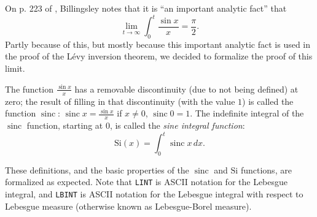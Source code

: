 \documentclass{article}
\theoremstyle{definition}
\newcommand\sinc{\mathop{\text{sinc}}\nolimits}
\newcommand\Si{\text{Si}}
\begin{document}
On p. 223 of \cite{billingsley}, Billingsley notes that it is ``an important analytic fact'' that
\[ \lim_{t \rightarrow \infty} \int_0^t \frac{\sin x}{x} = \frac{\pi}{2}. \]
Partly because of this, but mostly because this important analytic fact is used in the proof of the L\'evy inversion theorem, we decided to formalize the proof of this limit.

The function $\frac{\sin x}{x}$ has a removable discontinuity (due to not being defined) at zero; the result of filling in that discontinuity (with the value $1$) is called the function $\sinc$: $\sinc x = \frac{\sin x}{x}$ if $x \ne 0$, $\sinc 0 = 1$. The indefinite integral of the $\sinc$ function, starting at $0$, is called the {\em sine integral function}:
\[ \Si(x) = \int_0^t \sinc x \, dx. \]

These definitions, and the basic properties of the $\sinc$ and $\Si$ functions, are formalized as expected. Note that \texttt{LINT} is ASCII notation for the Lebesgue integral, and \texttt{LBINT} is ASCII notation for the Lebesgue integral with respect to Lebesgue measure (otherwise known as Lebesgue-Borel measure).\phantom{)}

\medskip
\end{document}
